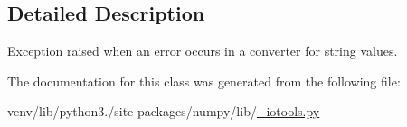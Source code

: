 \subsection{Detailed Description}
\begin{DoxyVerb}Exception raised when an error occurs in a converter for string values.\end{DoxyVerb}
 

The documentation for this class was generated from the following file\+:\begin{DoxyCompactItemize}
\item 
venv/lib/python3./site-\/packages/numpy/lib/\hyperlink{__iotools_8py}{\+\_\+iotools.\+py}\end{DoxyCompactItemize}

